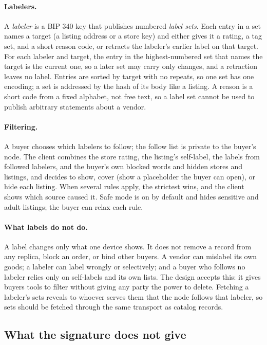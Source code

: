 \paragraph{Labelers.} A \emph{labeler} is a BIP 340 key that publishes numbered \emph{label sets}. Each entry in a set names a target (a listing address or a store key) and either gives it a rating, a tag set, and a short reason code, or retracts the labeler's earlier label on that target. For each labeler and target, the entry in the highest-numbered set that names the target is the current one, so a later set may carry only changes, and a retraction leaves no label. Entries are sorted by target with no repeats, so one set has one encoding; a set is addressed by the hash of its body like a listing. A reason is a short code from a fixed alphabet, not free text, so a label set cannot be used to publish arbitrary statements about a vendor.

\paragraph{Filtering.} A buyer chooses which labelers to follow; the follow list is private to the buyer's node. The client combines the store rating, the listing's self-label, the labels from followed labelers, and the buyer's own blocked words and hidden stores and listings, and decides to show, cover (show a placeholder the buyer can open), or hide each listing. When several rules apply, the strictest wins, and the client shows which source caused it. Safe mode is on by default and hides sensitive and adult listings; the buyer can relax each rule.

\paragraph{What labels do not do.} A label changes only what one device shows. It does not remove a record from any replica, block an order, or bind other buyers. A vendor can mislabel its own goods; a labeler can label wrongly or selectively; and a buyer who follows no labeler relies only on self-labels and its own lists. The design accepts this: it gives buyers tools to filter without giving any party the power to delete. Fetching a labeler's sets reveals to whoever serves them that the node follows that labeler, so sets should be fetched through the same transport as catalog records.

\subsection{What the signature does not give}

